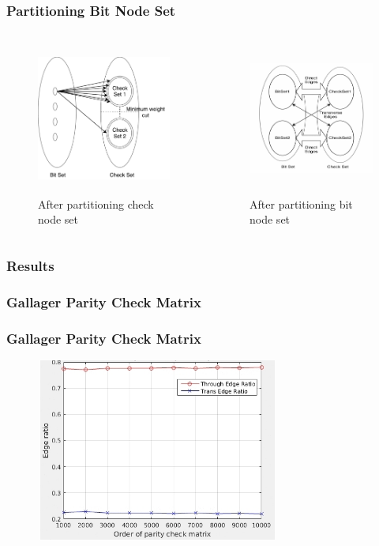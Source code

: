 \documentclass[xcolor=dvipsname]
{beamer}
\begin{document}
		\begin{frame}[t] 
\frametitle{ Partitioning Bit Node Set  }
\begin{columns}
\begin{figure}
\includegraphics[height=5cm,width=5cm]{bitnodepar}
\caption{ After partitioning check node set }
			\end{figure}

\begin{figure}
				\includegraphics[height=5cm,width=5cm]{partition}
				\caption{ After partitioning bit node set}
			\end{figure}
\end{columns}
		\end{frame}		
\subsubsection{Results }	
		\subsubsection{Gallager Parity Check Matrix}	
		\begin{frame}[t] 
			\frametitle{Gallager Parity Check Matrix}
			
			\begin{figure}
				\includegraphics[height=6cm,width=8cm]{gallager}
			\end{figure}
			
		\end{frame}
		
\end{document}
